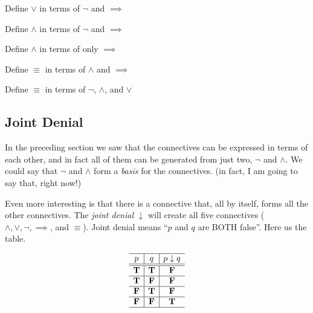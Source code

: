 \newpage
\begin{problem}
Define $\lor$ in terms of $\neg$ and $\implies$
\end{problem}

\begin{problem}
Define $\land$ in terms of $\neg$ and $\implies$
\end{problem}


\begin{problem}
Define $\land$ in terms of only $\implies$
\end{problem}


\begin{problem}
Define $\equiv$ in terms of $\land$ and $\implies$
\end{problem}

\begin{problem}
Define $\equiv$ in terms of $\neg$, $\land$, and $\lor$
\end{problem}

\subsection*{Joint Denial}
In the preceding section we saw that the connectives can be expressed in terms of each other, and in fact all of them can be generated from just two, $\neg$ and $\land$.  We could say that $\neg$ and $\land$ form a \emph{basis} for the connectives.  (in fact, I am going to say that, right now!)

Even more interesting is that there is a connective that, all by itself, forms all the other connectives.  The \emph{joint denial} $\downarrow$ will create all five connectives ($\land, \lor, \neg, \implies$, and $\equiv$).  Joint denial means ``$p$ and $q$ are BOTH false''.  Here us the table.

\[  \begin{array}{c|c|c}
  \hline  
  p & q & p\downarrow q\\
  \hline
  \hline
 \mathbf{T} &  \mathbf{T} &  \mathbf{F}\\
  \hline
 \mathbf{T} &  \mathbf{F} &  \mathbf{F}\\
  \hline
 \mathbf{F} &  \mathbf{T} &  \mathbf{F}\\
  \hline
 \mathbf{F} &  \mathbf{F} &  \mathbf{T}\\
    \hline
    \end{array}\]
    
